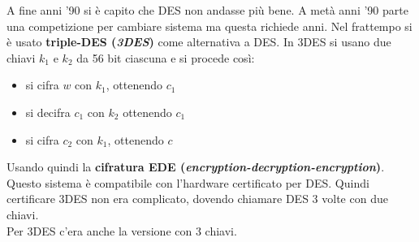 \documentclass[a4paper,12pt, oneside]{book}
\begin{document}
A fine anni '90 si è capito che DES non andasse più bene. A metà anni '90 parte
una competizione per cambiare sistema ma questa richiede anni. Nel frattempo si
è usato \textbf{triple-DES (\textit{3DES})} come alternativa a DES. In 3DES si
usano due chiavi $k_1$ e $k_2$ da 56 bit ciascuna e si procede così:
\begin{itemize}
  \item si cifra $w$ con $k_1$, ottenendo $c_1$
  \item si decifra $c_1$ con $k_2$ ottenendo $c_1$
  \item si cifra $c_2$ con $k_1$, ottenendo $c$
\end{itemize}
Usando quindi la \textbf{cifratura EDE
  (\textit{encryption-decryption-encryption})}. \\
Questo sistema è compatibile con l'hardware certificato per DES. Quindi
certificare 3DES non era complicato, dovendo chiamare DES 3 volte con due
chiavi.\\ 
Per 3DES c'era anche la versione con 3 chiavi.
\end{document}
